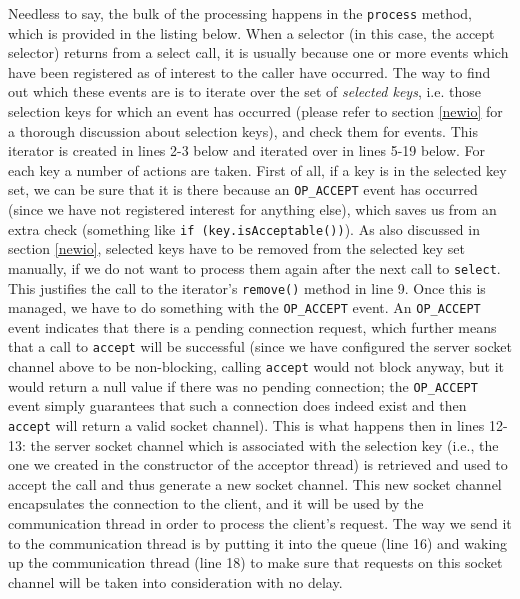 \documentclass[a4paper,10pt]{article}
\begin{document}
Needless to say, the bulk of the processing happens in the \texttt{process} method, which is provided in the
listing below. When a selector (in this case, the accept selector) returns from a select call, it is usually because
one or more events which have been registered as of interest to the caller have occurred. The way to find out
which these events are is to iterate over the set of \textit{selected keys}, i.e. those selection keys for which
an event has occurred (please refer to section \ref{newio} for a thorough discussion about selection keys), and
check them for events. This iterator is created in lines 2-3 below and iterated over in lines 5-19 below. For each
key a number of actions are taken. First of all, if a key is in the selected key set, we can be sure that it is
there because an \texttt{OP\_ACCEPT} event has occurred (since we have not registered interest for anything
else), which saves us from an extra check (something like \texttt{if (key.isAcceptable())}). As also discussed
in section \ref{newio}, selected keys have to be removed from the selected key set manually, if we do not want
to process them again after the next call to \texttt{select}. This justifies the call to the iterator's \texttt{remove()} method in line 9. Once this
is managed, we have to do something with the \texttt{OP\_ACCEPT} event. An \texttt{OP\_ACCEPT} event
indicates that there is a pending connection request, which further means that a call to \texttt{accept} will
be successful (since we have configured the server socket channel above to be non-blocking, calling \texttt{accept}
would not block anyway, but it would return a null value if there was no pending connection; the \texttt{OP\_ACCEPT}
event simply guarantees that such a connection does indeed exist and then \texttt{accept} will return a valid
socket channel). This is what happens then in lines 12-13: the server socket channel which is associated with
the selection key (i.e., the one we created in the constructor of the acceptor thread) is retrieved and used to accept the
call and thus generate a new socket channel. This new socket channel encapsulates the connection to the client,
and it will be used by the communication thread in order to process the client's request. The way we send
it to the communication thread is by putting it into the queue (line 16) and waking up the communication
thread (line 18) to make sure that requests on this socket channel will be taken into consideration with no
delay.
\end{document}
